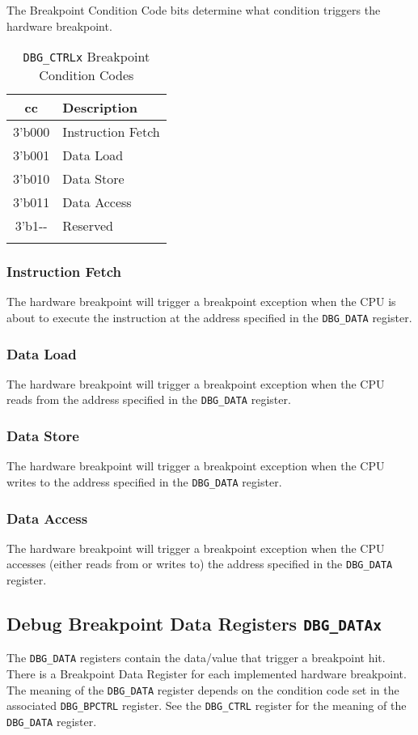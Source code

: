The Breakpoint Condition Code bits determine what condition triggers the
hardware breakpoint.

\begin{longtable}[]{@{}cl@{}}
\toprule
cc & Description\tabularnewline
\midrule
\endhead
3'b000 & Instruction Fetch\tabularnewline
3'b001 & Data Load\tabularnewline
3'b010 & Data Store\tabularnewline
3'b011 & Data Access\tabularnewline
3'b1-\/- & Reserved\tabularnewline
\bottomrule
\caption{\texttt{DBG\_CTRLx} Breakpoint Condition Codes}
\end{longtable} 

\subsubsection{Instruction Fetch}\label{instruction-fetch}

The hardware breakpoint will trigger a breakpoint exception when the CPU
is about to execute the instruction at the address specified in the
\texttt{DBG\_DATA} register.

\subsubsection{Data Load}\label{data-load}

The hardware breakpoint will trigger a breakpoint exception when the CPU
reads from the address specified in the \texttt{DBG\_DATA} register.

\subsubsection{Data Store}\label{data-store}

The hardware breakpoint will trigger a breakpoint exception when the CPU
writes to the address specified in the \texttt{DBG\_DATA} register.

\subsubsection{Data Access}\label{data-access}

The hardware breakpoint will trigger a breakpoint exception when the CPU
accesses (either reads from or writes to) the address specified in the
\texttt{DBG\_DATA} register.

\subsection{Debug Breakpoint Data Registers
\texttt{DBG\_DATAx}}\label{debug-breakpoint-data-registers-dbg_datax}



The \texttt{DBG\_DATA} registers contain the data/value that trigger a breakpoint
hit. There is a Breakpoint Data Register for each implemented hardware
breakpoint. The meaning of the \texttt{DBG\_DATA} register depends on the
condition code set in the associated \texttt{DBG\_BPCTRL} register. See the
\texttt{DBG\_CTRL} register for the meaning of the \texttt{DBG\_DATA} register.
